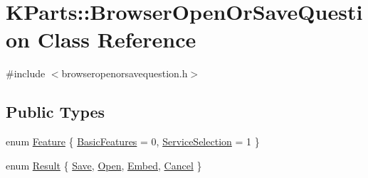 \hypertarget{classKParts_1_1BrowserOpenOrSaveQuestion}{\section{\-K\-Parts\-:\-:\-Browser\-Open\-Or\-Save\-Question \-Class \-Reference}
\label{classKParts_1_1BrowserOpenOrSaveQuestion}
}


{\ttfamily \#include $<$browseropenorsavequestion.\-h$>$}

\subsection*{\-Public \-Types}
\begin{DoxyCompactItemize}
\item 
enum \hyperlink{classKParts_1_1BrowserOpenOrSaveQuestion_a9dfe6a7919cfadff826a357e94ac3a9a}{\-Feature} \{ \hyperlink{classKParts_1_1BrowserOpenOrSaveQuestion_a9dfe6a7919cfadff826a357e94ac3a9aa1cfa50dab189d46bdc4a66c5a1763168}{\-Basic\-Features} =  0, 
\hyperlink{classKParts_1_1BrowserOpenOrSaveQuestion_a9dfe6a7919cfadff826a357e94ac3a9aa3bc1c3177b1a3c8f4cd297ae558c155e}{\-Service\-Selection} =  1
 \}
\item 
enum \hyperlink{classKParts_1_1BrowserOpenOrSaveQuestion_a12842198b7684e9e246e9a207eabc93f}{\-Result} \{ \hyperlink{classKParts_1_1BrowserOpenOrSaveQuestion_a12842198b7684e9e246e9a207eabc93fad5f24b54978bf4ec2a36720d33ad7609}{\-Save}, 
\hyperlink{classKParts_1_1BrowserOpenOrSaveQuestion_a12842198b7684e9e246e9a207eabc93fa1135dc1f27b120bdd6dc83dd7254b60b}{\-Open}, 
\hyperlink{classKParts_1_1BrowserOpenOrSaveQuestion_a12842198b7684e9e246e9a207eabc93fa9038d40b03609466a8433c35b428bf5a}{\-Embed}, 
\hyperlink{classKParts_1_1BrowserOpenOrSaveQuestion_a12842198b7684e9e246e9a207eabc93fac5e1d49f3047805e8f216f11cbe903ab}{\-Cancel}
 \}
\end{DoxyCompactItemize}
